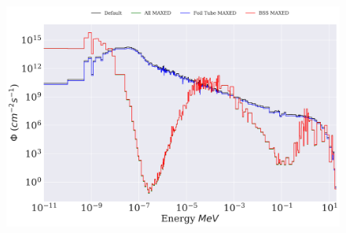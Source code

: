 \begin{figure}[htb]
\includegraphics[height=4in]{tex/figures/unfolded_mx_sc.png}
\caption[]{}
\label{fig:unfolded_mx_sc}
\end{figure}




